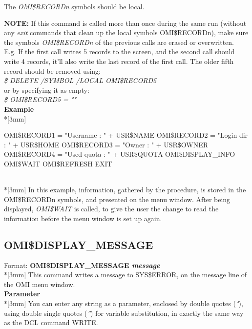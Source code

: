 \documentclass[a4paper]{book}
\newcommand{\vs}{\vspace{3mm}}
\renewcommand{\indent}{\hspace*{5mm}}
\begin{document}
The \textsl{OMI{\$}RECORD\textit{n}} symbols should be local.

\vs

\hspace{-8mm}\textbf{NOTE:}\label{note:dispinfo} If this command is called more than once during the same run 
(without any \textsl{exit} commands that clean up the local symbols 
OMI{\$}RECORDn), make sure the symbols \textsl{OMI{\$}RECORD\textit{n}} of the previous calls 
are erased or overwritten. \\
E.g. If the first call writes 5 records to the screen, and the second call 
should write 4 records, it'll also write the last record of the first call. 
The older fifth record should be removed using:\\
\indent\textsl{{\$} DELETE /SYMBOL /LOCAL OMI{\$}RECORD5} \\
or by specifying it as empty: \\
\indent\textsl{{\$} OMI{\$}RECORD5 = ""}\\[3mm]
\textbf{Example}\\*[3mm]
\begin{textsf}
\indent{\$} OMI{\$}RECORD1 = "Username : " + USR{\$}NAME \newline
\indent{\$} OMI{\$}RECORD2 = "Login dir : " + USR{\$}HOME \newline
\indent{\$} OMI{\$}RECORD3 = "Owner : " + USR{\$}OWNER \newline
\indent{\$} OMI{\$}RECORD4 = "Used quota : " + USR{\$}QUOTA \newline
\indent{\$} OMI{\$}DISPLAY{\_}INFO \newline
\indent{\$} OMI{\$}WAIT \newline
\indent{\$} OMI{\$}REFRESH \newline
\indent{\$} EXIT
\end{textsf}\\*[3mm]
In this example, information, gathered by the procedure, is stored in the 
\linebreak OMI{\$}RECORDn symbols, and presented on the menu window. After being 
displayed, \textsl{OMI{\$}WAIT} is called, 
to give the user the change to read the information before the menu window 
is set up again.

\subsection{OMI{\$}DISPLAY{\_}MESSAGE}
\label{subsubsec:mylabel52}
\indent Format: \textbf{OMI{\$}DISPLAY{\_}MESSAGE \textit{message}}\\*[3mm]
This command writes a message to SYS{\$}ERROR, on the message line of the 
OMI menu window.\\[3mm]
\textbf{Parameter}\\*[3mm]
You can enter any string as a parameter, enclosed by double quotes (\textsl{"}), 
using double single quotes (\textsl{''}) for variable substitution, in exactly the 
same way as the DCL command WRITE.
\end{document}
